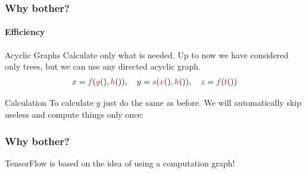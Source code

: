 \begin{frame}
    \frametitle{Why bother?}
    \framesubtitle{Efficiency}
    \begin{block}{Acyclic Graphs}
    Calculate only what is needed. Up to now we have considered only trees, but we can use any directed acyclic graph.
    \begin{align}
        x = \operation{f}(\operation{g}(), \operation{h}()), \quad
        y = \operation{s}({\operation{x}(), \operation{h}()}), \quad
        z = \operation{f}(\operation{t}())
    \end{align}
    \end{block}
    \pause
    \begin{block}{Calculation}  
    To calculate $y$ just do the same as before. We will automatically skip useless 
    and compute things only once:
    \end{block}
\end{frame}

\begin{frame}
    \frametitle{Why bother?}
    \large{TensorFlow is based on the idea of using a computation graph!}
\end{frame}
